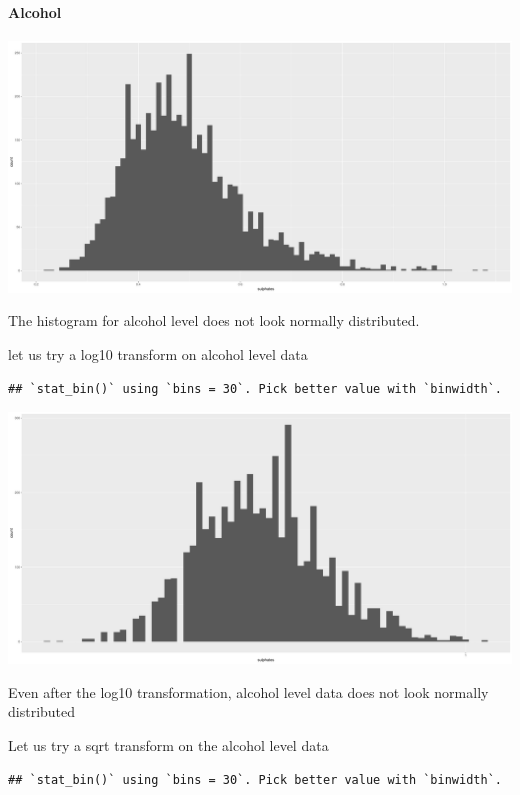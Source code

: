 \documentclass[]{article}
\let\oldparagraph\paragraph
\renewcommand{\paragraph}[1]{\oldparagraph{#1}\mbox{}}
\begin{document}
\paragraph{Alcohol}\label{alcohol}

\includegraphics{White_wine_quality_files/figure-latex/unnamed-chunk-20-1.pdf}

The histogram for alcohol level does not look normally distributed.

let us try a log10 transform on alcohol level data

\begin{verbatim}
## `stat_bin()` using `bins = 30`. Pick better value with `binwidth`.
\end{verbatim}

\includegraphics{White_wine_quality_files/figure-latex/unnamed-chunk-21-1.pdf}

Even after the log10 transformation, alcohol level data does not look
normally distributed

Let us try a sqrt transform on the alcohol level data

\begin{verbatim}
## `stat_bin()` using `bins = 30`. Pick better value with `binwidth`.
\end{verbatim}
\end{document}
